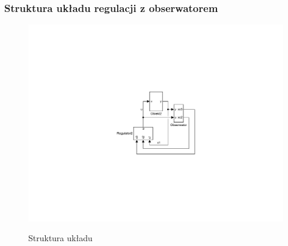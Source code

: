 \documentclass{article}
\begin{document}
\subsubsection{Struktura układu regulacji z obserwatorem}
\begin{figure}[H]
\includegraphics[clip, trim=9cm 7cm 9cm 7cm, width=1.00\textwidth]{../rys/zad4_regobs.pdf}
\label{fig:zad4regobs}
\caption{Struktura układu}
\end{figure}
\end{document}
